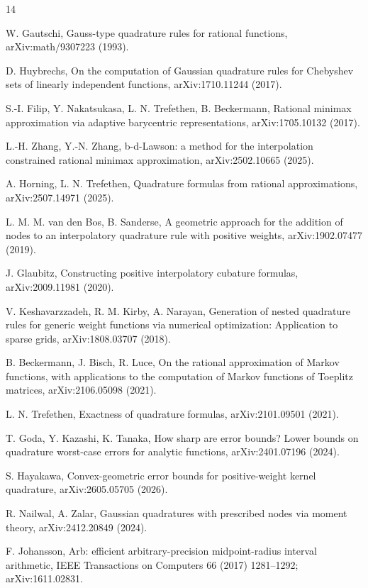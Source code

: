\documentclass[preprint,12pt]{elsarticle}
\theoremstyle{remark}
\begin{document}
\begin{thebibliography}{14}
\providecommand{\url}[1]{\texttt{#1}}

W. Gautschi, Gauss-type quadrature rules for rational functions,
arXiv:math/9307223 (1993).

D. Huybrechs, On the computation of Gaussian quadrature rules for
Chebyshev sets of linearly independent functions,
arXiv:1710.11244 (2017).

S.-I. Filip, Y. Nakatsukasa, L. N. Trefethen, B. Beckermann,
Rational minimax approximation via adaptive barycentric
representations, arXiv:1705.10132 (2017).

L.-H. Zhang, Y.-N. Zhang, b-d-Lawson: a method for the interpolation
constrained rational minimax approximation,
arXiv:2502.10665 (2025).

A. Horning, L. N. Trefethen, Quadrature formulas from rational
approximations, arXiv:2507.14971 (2025).

L. M. M. van den Bos, B. Sanderse, A geometric approach for the
addition of nodes to an interpolatory quadrature rule with positive
weights, arXiv:1902.07477 (2019).

J. Glaubitz, Constructing positive interpolatory cubature formulas,
arXiv:2009.11981 (2020).

V. Keshavarzzadeh, R. M. Kirby, A. Narayan, Generation of nested
quadrature rules for generic weight functions via numerical
optimization: Application to sparse grids, arXiv:1808.03707 (2018).

B. Beckermann, J. Bisch, R. Luce, On the rational approximation of
Markov functions, with applications to the computation of Markov
functions of Toeplitz matrices, arXiv:2106.05098 (2021).

L. N. Trefethen, Exactness of quadrature formulas,
arXiv:2101.09501 (2021).

T. Goda, Y. Kazashi, K. Tanaka, How sharp are error bounds? Lower
bounds on quadrature worst-case errors for analytic functions,
arXiv:2401.07196 (2024).

S. Hayakawa, Convex-geometric error bounds for positive-weight kernel
quadrature, arXiv:2605.05705 (2026).

R. Nailwal, A. Zalar, Gaussian quadratures with prescribed nodes via
moment theory, arXiv:2412.20849 (2024).


F. Johansson, Arb: efficient arbitrary-precision midpoint-radius
interval arithmetic, IEEE Transactions on Computers 66 (2017)
1281--1292; arXiv:1611.02831.

\end{thebibliography}
\end{document}
